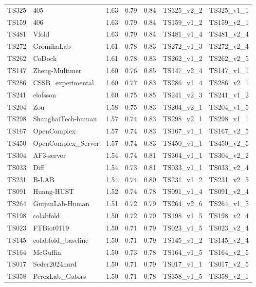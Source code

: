 \begin{table}[ht]
{\begin{tabular}{llrrrll}
TS325 & 405 & 1.63 & 0.79 & 0.84 & TS325\_v2\_2 & TS325\_v1\_1 \\ 
TS159 & 406 & 1.63 & 0.79 & 0.84 & TS159\_v1\_2 & TS159\_v2\_1 \\ 
TS481 & Vfold & 1.63 & 0.79 & 0.84 & TS481\_v1\_4 & TS481\_v2\_4 \\ 
TS272 & GromihaLab & 1.61 & 0.78 & 0.83 & TS272\_v1\_3 & TS272\_v2\_4 \\ 
TS262 & CoDock & 1.61 & 0.78 & 0.83 & TS262\_v1\_2 & TS262\_v2\_5 \\ 
TS147 & Zheng-Multimer & 1.60 & 0.76 & 0.85 & TS147\_v2\_4 & TS147\_v1\_1 \\ 
TS286 & CSSB\_experimental & 1.60 & 0.77 & 0.83 & TS286\_v1\_4 & TS286\_v2\_1 \\ 
TS241 & elofsson & 1.60 & 0.75 & 0.85 & TS241\_v2\_3 & TS241\_v1\_2 \\ 
TS204 & Zou & 1.58 & 0.75 & 0.83 & TS204\_v2\_1 & TS204\_v1\_5 \\ 
TS298 & ShanghaiTech-human & 1.57 & 0.74 & 0.83 & TS298\_v2\_1 & TS298\_v1\_1 \\ 
TS167 & OpenComplex & 1.57 & 0.74 & 0.83 & TS167\_v1\_1 & TS167\_v2\_5 \\ 
TS450 & OpenComplex\_Server & 1.57 & 0.74 & 0.83 & TS450\_v1\_1 & TS450\_v2\_5 \\ 
TS304 & AF3-server & 1.54 & 0.74 & 0.81 & TS304\_v1\_1 & TS304\_v2\_2 \\ 
TS033 & Diff & 1.54 & 0.73 & 0.81 & TS033\_v1\_1 & TS033\_v2\_4 \\ 
TS231 & B-LAB & 1.54 & 0.74 & 0.80 & TS231\_v1\_2 & TS231\_v2\_5 \\ 
TS091 & Huang-HUST & 1.52 & 0.74 & 0.78 & TS091\_v1\_4 & TS091\_v2\_4 \\ 
TS264 & GuijunLab-Human & 1.51 & 0.72 & 0.79 & TS264\_v2\_6 & TS264\_v1\_5 \\ 
TS198 & colabfold & 1.50 & 0.72 & 0.79 & TS198\_v1\_5 & TS198\_v2\_4 \\ 
TS023 & FTBiot0119 & 1.50 & 0.71 & 0.79 & TS023\_v1\_5 & TS023\_v2\_4 \\ 
TS145 & colabfold\_baseline & 1.50 & 0.71 & 0.79 & TS145\_v1\_2 & TS145\_v2\_4 \\ 
TS164 & McGuffin & 1.50 & 0.73 & 0.78 & TS164\_v1\_5 & TS164\_v2\_5 \\ 
TS017 & Seder2024hard & 1.50 & 0.71 & 0.79 & TS017\_v1\_1 & TS017\_v2\_5 \\ 
TS358 & PerezLab\_Gators & 1.50 & 0.71 & 0.78 & TS358\_v1\_5 & TS358\_v2\_1 \\ 

\end{tabular}}
\end{table}
